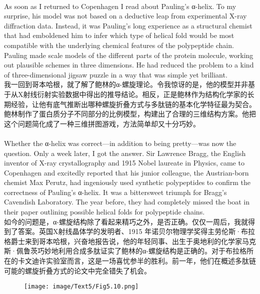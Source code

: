 \documentclass{article}
\begin{document}
\\
As soon as I returned to Copenhagen I read about Pauling’s α-helix. To my surprise, his model was not based on a deductive leap from experimental X-ray diffraction data. Instead, it was Pauling’s long experience as a structural chemist that had emboldened him to infer which type of helical fold would be most compatible with the underlying chemical features of the polypeptide chain. Pauling made scale models of the different parts of the protein molecule, working out plausible schemes in three dimensions. He had reduced the problem to a kind of three-dimensional jigsaw puzzle in a way that was simple yet brilliant.\\
我一回到哥本哈根，就了解了鲍林的α-螺旋理论。令我惊讶的是，他的模型并非基于从X射线衍射实验数据中得出的推导结论。相反，正是鲍林作为结构化学家的长期经验，让他有底气推断出哪种螺旋折叠方式与多肽链的基本化学特征最为契合。鲍林制作了蛋白质分子不同部分的比例模型，构建出了合理的三维结构方案。他把这个问题简化成了一种三维拼图游戏，方法简单却又十分巧妙。\\

\\
Whether the α-helix was correct—in addition to being pretty—was now the question. Only a week later, I got the answer. Sir Lawrence Bragg, the English inventor of X-ray crystallography and 1915 Nobel laureate in Physics, came to Copenhagen and excitedly reported that his junior colleague, the Austrian-born chemist Max Perutz, had ingeniously used synthetic polypeptides to confirm the correctness of Pauling’s α-helix. It was a bittersweet triumph for Bragg’s Cavendish Laboratory. The year before, they had completely missed the boat in their paper outlining possible helical folds for polypeptide chains.\\
如今的问题是，α-螺旋结构除了看起来精巧之外，是否正确。仅仅一周后，我就得到了答案。英国X射线晶体学的发明者、1915 年诺贝尔物理学奖得主劳伦斯·布拉格爵士来到哥本哈根，兴奋地报告说，他的年轻同事、出生于奥地利的化学家马克斯·佩鲁茨巧妙地利用合成多肽证实了鲍林的α-螺旋结构是正确的。对于布拉格所在的卡文迪许实验室而言，这是一场喜忧参半的胜利。前一年，他们在概述多肽链可能的螺旋折叠方式的论文中完全错失了机会。\\

\begin{figure}
    \centering
    \texttt{[image: image/Text5/Fig5.10.png]}
\end{figure}
\end{document}
